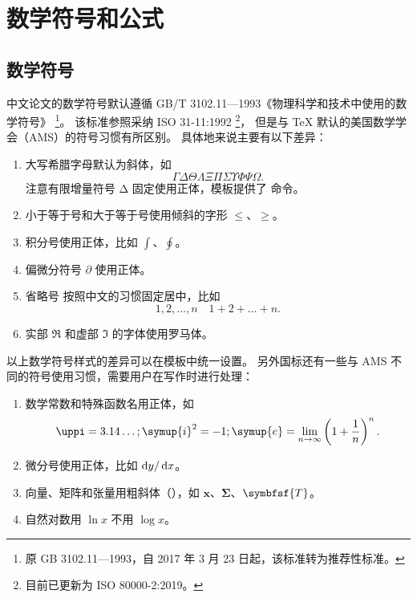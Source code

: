 
\chapter{数学符号和公式}

\section{数学符号}

中文论文的数学符号默认遵循 GB/T 3102.11—1993《物理科学和技术中使用的数学符号》
\footnote{原 GB 3102.11—1993，自 2017 年 3 月 23 日起，该标准转为推荐性标准。}。
该标准参照采纳 ISO 31-11:1992 \footnote{目前已更新为 ISO 80000-2:2019。}，
但是与 \TeX{} 默认的美国数学学会（AMS）的符号习惯有所区别。
具体地来说主要有以下差异：
\begin{enumerate}
  \item 大写希腊字母默认为斜体，如
    \begin{equation*}
      \Gamma \Delta \Theta \Lambda \Xi \Pi \Sigma \Upsilon \Phi \Psi \Omega.
    \end{equation*}
    注意有限增量符号 $\increment$ 固定使用正体，模板提供了  命令。
  \item 小于等于号和大于等于号使用倾斜的字形 $\le$、$\ge$。
  \item 积分号使用正体，比如 $\int$、$\oint$。
  \item
    偏微分符号 $\partial$ 使用正体。
  \item
    省略号  按照中文的习惯固定居中，比如
    \begin{equation*}
      1, 2, \dots, n \quad 1 + 2 + \dots + n.
    \end{equation*}
  \item
    实部 $\Re$ 和虚部 $\Im$ 的字体使用罗马体。
\end{enumerate}

以上数学符号样式的差异可以在模板中统一设置。
另外国标还有一些与 AMS 不同的符号使用习惯，需要用户在写作时进行处理：
\begin{enumerate}
  \item 数学常数和特殊函数名用正体，如
    \begin{equation*}
      \uppi = 3.14\dots; \quad
      \symup{i}^2 = -1; \quad
      \symup{e} = \lim_{n \to \infty} \left( 1 + \frac{1}{n} \right)^n.
    \end{equation*}
  \item 微分号使用正体，比如 $\mathop{}\!\mathrm{d} y / \mathop{}\!\mathrm{d} x$。
  \item 向量、矩阵和张量用粗斜体（），如 $\symbf{x}$、$\symbf{\Sigma}$、$\symbfsf{T}$。
  \item 自然对数用 $\ln x$ 不用 $\log x$。
\end{enumerate}


